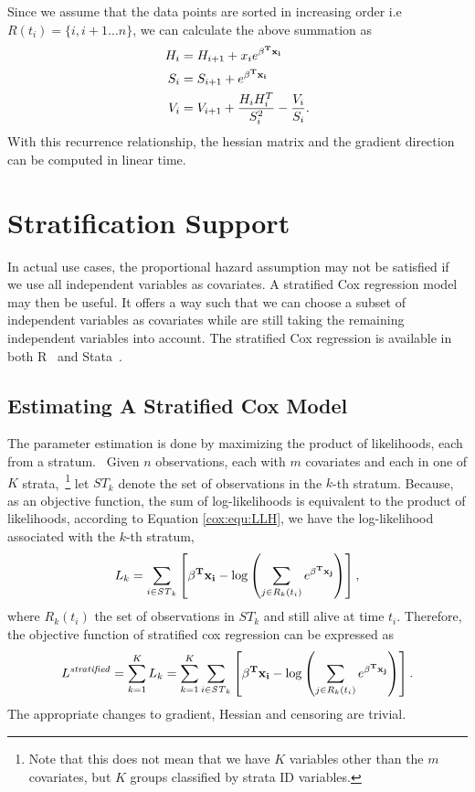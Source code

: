 Since we assume that the data points are sorted in increasing order i.e $R(t_i) = \{i, i+1 \ldots n \}$, we can calculate the above summation as 
\begin{align}
H_{i}& =   H_{i+1} +  x_{i} e^{\bold{\beta^T x_i}}\\
S_i & = S_{i+1} + e^{\bold{\beta^T x_i}} \\
V_i & = V_{i+1} +  \frac{H_{i}H_{i}^T }{ S_{i}^2 } -  \frac{V_{i}}{ S_{i}}.
\end{align}
With this recurrence relationship, the hessian matrix and the gradient direction can be computed in linear time.



\section{Stratification Support}\label{cox:stratified}
In actual use cases, the proportional hazard assumption may not be satisfied if we use all independent variables as covariates.
A stratified Cox regression model may then be useful.
It offers a way such that we can choose a subset of independent variables as covariates while are still taking the remaining independent variables into account.
The stratified Cox regression is available in both R~\cite{r-cox} and Stata~\cite{stata-cox}.

\subsection{Estimating A Stratified Cox Model}\label{cox:estimate-stratified}
The parameter estimation is done by maximizing the product of likelihoods, each from a stratum.~\cite{stratified-ethz-slides}
Given $n$ observations, each with $m$ covariates and each in one of $K$ strata,~\footnote{Note that this does not mean that we have $K$ variables other than the $m$ covariates, but $K$ groups classified by strata ID variables.}  let $\mathit{ST}_{k}$ denote the set of observations in the $k$-th stratum.
Because, as an objective function, the sum of log-likelihoods is equivalent to the product of likelihoods, according to Equation \ref{cox:equ:LLH}, we have the log-likelihood associated with the $k$-th stratum,
\[
L_{k} = \sum_{i \in \mathit{ST}_{k}} \left[  \bold{\beta^T x_i} - \log\left(\sum_{j \in R_k(t_i)} e^{\bold{\beta^T x_j} } \right) \right],
\]
where $R_k(t_i)$ the set of observations in $\mathit{ST}_{k}$ and still alive at time $t_i$.
Therefore, the objective function of stratified cox regression can be expressed as
\begin{equation}\label{cox:equ:stratified-obj}
L^{\mathit{stratified}} = \sum_{k=1}^{K} L_{k} = \sum_{k=1}^{K} \sum_{i \in \mathit{ST}_{k}} \left[  \bold{\beta^T x_i} - \log\left(\sum_{j \in R_k(t_i)} e^{\bold{\beta^T x_j} } \right) \right].
\end{equation}
The appropriate changes to gradient, Hessian and censoring are trivial.

